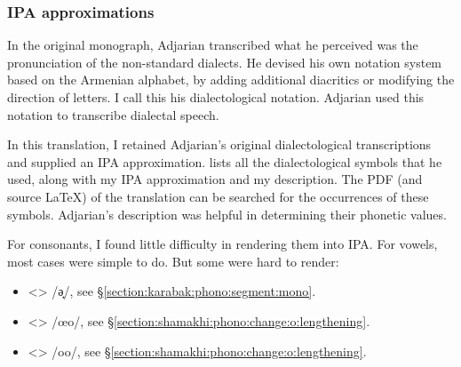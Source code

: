 \documentclass[output=paper]{langscibook}
\begin{document}
\subsubsection{IPA approximations}\label{sec:HossepIntro:phonotransc:adj:ipa}
\largerpage[-1]

In the original monograph, Adjarian transcribed what he perceived was the pronunciation of the non-standard dialects. He devised his own notation system based on the Armenian alphabet, by adding additional diacritics or modifying the direction of letters. I call this his dialectological notation. Adjarian used this notation to transcribe dialectal speech.

In this translation, I retained Adjarian's original dialectological transcriptions and supplied  an IPA approximation.   lists all the dialectological symbols that he used, along with my IPA approximation and my   description. The PDF (and source LaTeX) of the translation can be searched for the occurrences of these symbols. Adjarian's  description was  helpful in determining their phonetic values.  

For consonants, I found little difficulty in rendering them into IPA. For vowels, most cases were simple to do. But some were hard to render:  
\begin{itemize}
	\item <> /ə̟/,  see \S\ref{section:karabak:phono:segment:mono}. 
	\item <> /œo/, see \S\ref{section:shamakhi:phono:change:o:lengthening}. 
	\item <> /oo/, see \S\ref{section:shamakhi:phono:change:o:lengthening}.
\end{itemize}
\end{document}
